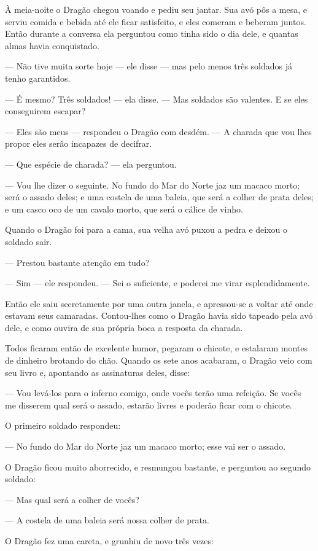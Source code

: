 À meia-noite o Dragão chegou voando e pediu seu jantar. Sua avó pôs a
mesa, e serviu comida e bebida até ele ficar satisfeito, e eles
comeram e beberam juntos. Então durante a conversa ela perguntou como
tinha sido o dia dele, e quantas almas havia conquistado.

— Não tive muita sorte hoje — ele disse — mas pelo menos três soldados
já tenho garantidos.

— É mesmo? Três soldados! — ela disse. — Mas soldados são valentes. E
se eles conseguirem escapar?

— Eles são meus — respondeu o Dragão com desdém. — A charada que vou
lhes propor eles serão incapazes de decifrar.

— Que espécie de charada? — ela perguntou.

— Vou lhe dizer o seguinte. No fundo do Mar do Norte jaz um macaco
morto; será o assado deles; e uma costela de uma baleia, que será a
colher de prata deles; e um casco oco de um cavalo morto, que será o
cálice de vinho. 

Quando o Dragão foi para a cama, sua velha avó puxou a pedra e deixou
o soldado sair.

— Prestou bastante atenção em tudo?

— Sim — ele respondeu. — Sei o suficiente, e poderei me virar
esplendidamente.

Então ele saiu secretamente por uma outra janela, e apressou-se a
voltar até onde estavam seus camaradas. Contou-lhes como o Dragão
havia sido tapeado pela avó dele, e como ouvira de sua própria boca a
resposta da charada.

Todos ficaram então de excelente humor, pegaram o chicote, e estalaram
montes de dinheiro brotando do chão. Quando os sete anos acabaram, o
Dragão veio com seu livro e, apontando as assinaturas deles, disse:

— Vou levá-los para o inferno comigo, onde vocês terão uma refeição.
Se vocês me disserem qual será o assado, estarão livres e poderão
ficar com o chicote.

O primeiro soldado respondeu:

— No fundo do Mar do Norte jaz um macaco morto; esse vai ser o assado.

O Dragão ficou muito aborrecido, e resmungou bastante, e perguntou ao
segundo soldado:

— Mas qual será a colher de vocês?

— A costela de uma baleia será nossa colher de prata.

O Dragão fez uma careta, e grunhiu de novo três vezes:


